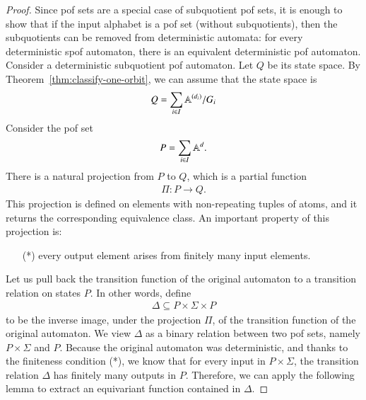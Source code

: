 \begin{proof}
    Since pof sets are a special case of subquotient pof sets, it is enough to show that if the input alphabet is a pof set (without subquotients), then the subquotients can be removed from deterministic automata: for every deterministic spof automaton, there is an equivalent  deterministic pof automaton. Consider a deterministic subquotient pof automaton. Let $Q$ be its state space. By Theorem~\ref{thm:classify-one-orbit}, we can assume that the state space is 
    \begin{align*}
Q =     \sum_{i \in I} \mathbb A^{(d_i)} / G_i
    \end{align*}
    Consider the pof set 
    \begin{align*}
    P = \sum_{i \in I} \mathbb A^{d}.
    \end{align*}
    There is a natural projection from $P$ to $Q$, which is a partial function 
    \begin{align*}
    \Pi : P \to Q.
    \end{align*}
This projection is  defined on elements with non-repeating tuples of atoms, and it returns the corresponding equivalence class. An important property of this projection is: 
\begin{enumerate}
    \item[(*)] every output element arises from finitely many input elements. 
\end{enumerate}
Let us pull back the transition function of the original automaton to a transition relation on states $P$. In other words, define 
\begin{align*}
\Delta \subseteq P \times \Sigma \times P 
\end{align*}
to be the inverse image, under the projection $\Pi$, of the transition function of the original automaton. We view $\Delta$ as a binary relation between two pof sets, namely $P \times \Sigma$ and $P$. Because the original automaton was deterministic,  and thanks to the finiteness condition (*), we know that for every input in $P \times \Sigma$, the transition relation $\Delta$ has finitely many outputs in $P$. Therefore, we can apply the following lemma to extract an equivariant function contained in $\Delta$.



\end{proof}
